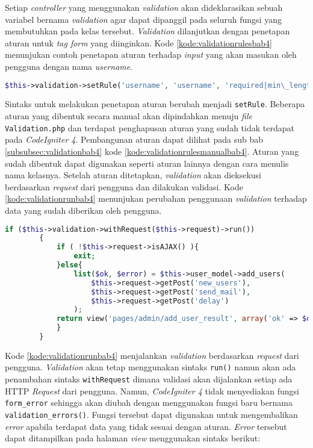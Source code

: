 Setiap \textit{controller} yang menggunakan \textit{validation} akan dideklarasikan sebuah variabel bernama \textit{validation} agar dapat dipanggil pada seluruh fungsi yang membutuhkan pada kelas tersebut. \textit{Validation} dilanjutkan dengan penetapan aturan untuk \textit{tag form} yang diinginkan. Kode \ref{kode:validationrulesbab4} menunjukan contoh penetapan aturan terhadap \textit{input} yang akan masukan oleh pengguna dengan nama \textit{username}.

\begin{lstlisting}[language=PHP, caption=Perancangan perubahan konfigurasi aturan pada \textit{library validation}, label=kode:validationrulesbab4]
$this->validation->setRule('username', 'username', 'required|min\_length[3]|max\_length[20]);
\end{lstlisting}

Sintaks untuk melakukan penetapan aturan berubah menjadi \texttt{setRule}. Beberapa aturan yang dibentuk secara manual akan dipindahkan menuju \textit{file} \texttt{Validation.php} dan terdapat penghapusan aturan yang sudah tidak terdapat pada \textit{CodeIgniter 4}. Pembangunan aturan dapat dilihat pada sub bab \ref{subsubsec:validationbab4} kode \ref{kode:validationrulesmanualbab4}. Aturan yang sudah dibentuk dapat digunakan seperti aturan lainnya dengan cara menulis nama kelasnya. Setelah aturan ditetapkan, \textit{validation} akan dieksekusi berdasarkan \textit{request} dari pengguna dan dilakukan validasi. Kode \ref{kode:validationrunbab4} menunjukan perubahan penggunaan \textit{validation} terhadap data yang sudah diberikan oleh pengguna.
\begin{lstlisting}[language=PHP, caption=Perancangan perubahan penggunaan \textit{validation} pada \textit{CodeIgniter 4}, label=kode:validationrunbab4]
if ($this->validation->withRequest($this->request)->run())
		{
			if ( !$this->request->isAJAX() ){
				exit;
			}else{
				list($ok, $error) = $this->user_model->add_users(
					$this->request->getPost('new_users'),
					$this->request->getPost('send_mail'),
					$this->request->getPost('delay')
				);
			return view('pages/admin/add_user_result', array('ok' => $ok, 'error' => $error));
			}
		}
\end{lstlisting}

Kode \ref{kode:validationrunbab4} menjalankan \textit{validation} berdasarkan \textit{request} dari pengguna. \textit{Validation} akan tetap menggunakan sintaks \texttt{run()} namun akan ada penambahan sintaks \texttt{withRequest} dimana validasi akan dijalankan setiap ada HTTP \textit{Request} dari pengguna. Namun, \textit{CodeIgniter 4} tidak menyediakan fungsi \texttt{form\_error} sehingga akan diubah dengan menggunakan fungsi baru bernama \texttt{validation\_errors()}. Fungsi tersebut dapat digunakan untuk mengembalikan \textit{error} apabila terdapat data yang tidak sesuai dengan aturan. \textit{Error} tersebut dapat ditampilkan pada halaman \textit{view} menggunakan sintaks berikut:

